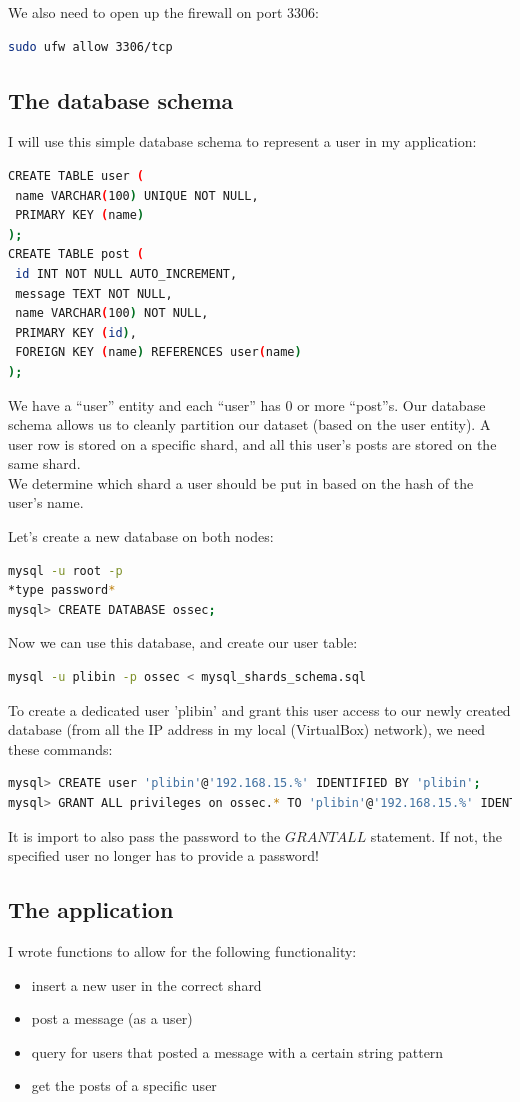 \documentclass[12pt]{report}
\begin{document}
We also need to open up the firewall on port 3306:
\begin{lstlisting}[language=bash]
sudo ufw allow 3306/tcp
\end{lstlisting}

\subsection{The database schema}
I will use this simple database schema to represent a user in my
application:
\begin{lstlisting}[language=bash]
CREATE TABLE user (
 name VARCHAR(100) UNIQUE NOT NULL, 
 PRIMARY KEY (name)
);
CREATE TABLE post (
 id INT NOT NULL AUTO_INCREMENT,
 message TEXT NOT NULL,
 name VARCHAR(100) NOT NULL,
 PRIMARY KEY (id),
 FOREIGN KEY (name) REFERENCES user(name)
);
\end{lstlisting}
We have a ``user'' entity and each ``user'' has 0 or more ``post''s. Our
database schema allows us to cleanly partition our dataset (based on
the user entity). A user row is stored on a specific shard, and all
this user's posts are stored on the same shard.\\
We determine which shard a user should be put in based on the hash of
the user's name.

Let's create a new database on both nodes:
\begin{lstlisting}[language=bash]
mysql -u root -p
*type password*
mysql> CREATE DATABASE ossec;
\end{lstlisting}
Now we can use this database, and create our user table:
\begin{lstlisting}[language=bash]
mysql -u plibin -p ossec < mysql_shards_schema.sql
\end{lstlisting}
To create a dedicated user 'plibin' and grant this user access to our
newly created database (from all the IP address in my local
(VirtualBox) network), we need these commands:
\begin{lstlisting}[language=bash]
mysql> CREATE user 'plibin'@'192.168.15.%' IDENTIFIED BY 'plibin';
mysql> GRANT ALL privileges on ossec.* TO 'plibin'@'192.168.15.%' IDENTIFIED BY 'plibin';
\end{lstlisting}

It is import to also pass the password to the $GRANT ALL$
statement. If not, the specified user no longer has to provide a
password!

\subsection{The application}
I wrote functions to allow for the following functionality:
\begin{itemize}
\item insert a new user in the correct shard
\item post a message (as a user)
\item query for users that posted a message with a certain string
  pattern
\item get the posts of a specific user
\end{itemize}
\end{document}
